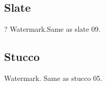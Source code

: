 \clearpage
\renewcommand{\matName}{Slate}
\subsection{\matName}

\renewcommand{\imgNumber}{01}
{}{}
\renewcommand{\imgNumber}{02}
{?}{}
\renewcommand{\imgNumber}{03}
{}{}
\renewcommand{\imgNumber}{04}
{}{}
\renewcommand{\imgNumber}{05}
{}{}
\renewcommand{\imgNumber}{06}
{}{}
\renewcommand{\imgNumber}{07}
{}{}
\renewcommand{\imgNumber}{08}
{}{}
\renewcommand{\imgNumber}{09}
{}{}
\renewcommand{\imgNumber}{10}
{}{}
\renewcommand{\imgNumber}{11}
{Watermark.}{Same as slate 09.}
\renewcommand{\imgNumber}{12}
{}{}

\clearpage
\renewcommand{\matName}{Stucco}
\subsection{\matName}

\renewcommand{\imgNumber}{01}
{}{}
\renewcommand{\imgNumber}{02}
{Watermark.}{}
\renewcommand{\imgNumber}{03}
{}{}
\renewcommand{\imgNumber}{04}
{}{}
\renewcommand{\imgNumber}{05}
{}{}
\renewcommand{\imgNumber}{06}
{}{}
\renewcommand{\imgNumber}{07}
{}{}
\renewcommand{\imgNumber}{08}
{}{}
\renewcommand{\imgNumber}{09}
{}{}
\renewcommand{\imgNumber}{10}
{}{Same as stucco 05.}
\renewcommand{\imgNumber}{11}
{}{}
\renewcommand{\imgNumber}{12}
{}{}

